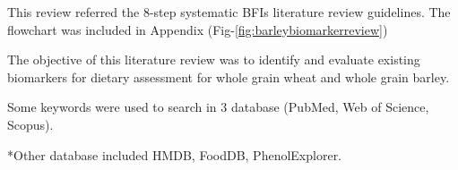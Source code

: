 This review referred the 8-step systematic BFIs literature review guidelines\cite{Pratico2018}. The flowchart was included in Appendix (Fig-\ref{fig:barleybiomarkerreview})

The objective of this literature review was to identify and evaluate existing biomarkers for dietary assessment for whole grain wheat and whole grain barley.

Some keywords were used to search in 3 database (PubMed, Web of Science, Scopus).



*Other database included HMDB, FoodDB, PhenolExplorer.